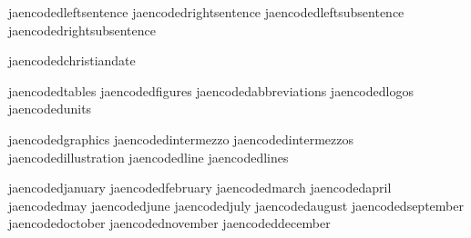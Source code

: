

   jaencodedleftsentence     {}
   jaencodedrightsentence    {}
   jaencodedleftsubsentence  {}
   jaencodedrightsubsentence {}

\stopencoding



   jaencodedchristiandate {}

   jaencodedtables        {}
   jaencodedfigures       {}
   jaencodedabbreviations {}
   jaencodedlogos         {}
   jaencodedunits         {}

   jaencodedgraphics      {}
   jaencodedintermezzo    {}
   jaencodedintermezzos   {}
   jaencodedillustration  {}
   jaencodedline          {}
   jaencodedlines         {}

   jaencodedjanuary       {}
   jaencodedfebruary      {}
   jaencodedmarch         {}
   jaencodedapril         {}
   jaencodedmay           {}
   jaencodedjune          {}
   jaencodedjuly          {}
   jaencodedaugust        {}
   jaencodedseptember     {}
   jaencodedoctober       {}
   jaencodednovember      {}
   jaencodeddecember      {}

